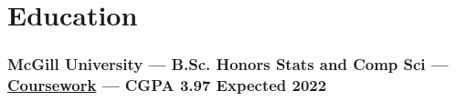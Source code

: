 \documentclass{article}
\begin{document}


\section{Education\hfill\normalsize }

\subsubsection{McGill University --- B.Sc. Honors Stats and Comp Sci --- \href{https:/colekillian.com/coursework-overview}{Coursework} --- CGPA 3.97 \hfill Expected 2022}


\end{document}
